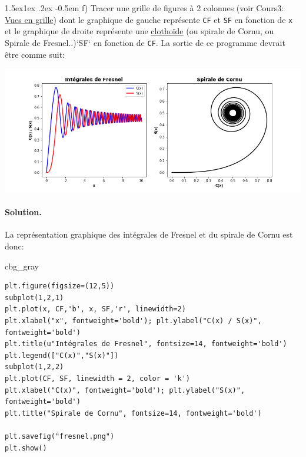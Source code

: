 \documentclass[%
oneside,                 %
final,                   %
10pt,french]{article}
\makeatletter
\newenvironment{_cod_tight}[1]{
   \def\FrameCommand{\colorbox{#1}}
   \FrameRule0.6pt\MakeFramed {\FrameRestore}\vskip3mm}
   {\vskip0mm\endMakeFramed}
\newenvironment{cod}[1]{
\bgroup\rmfamily
\fboxsep=0mm\relax
\begin{_cod_tight}{#1}
\list{}{\parsep=-2mm\parskip=0mm\topsep=0pt\leftmargin=2mm
\rightmargin=2\leftmargin\leftmargin=4pt\relax}
\item\relax}
{\endlist\end{_cod_tight}\egroup}
\newenvironment{doconceexercise}{}{}
\newcommand\subex{\@startsection{paragraph}{4}{\z@}%
                  {1.5ex\@plus1ex \@minus.2ex}%
                  {-0.5em}%
                  {\normalfont\normalsize\bfseries}}
\makeatother
\begin{document}
\begin{doconceexercise}

\subex{f)}
Tracer une grille de figures à 2 colonnes (voir Cours3: \href{{https://codetunisia.github.io/CoursSimNum/cours3/md/cours3.html#linstruction-subplot}}{Vues en grille}) dont le graphique de gauche représente \texttt{CF} et \texttt{SF} en fonction de \texttt{x} et le graphique de droite représente une \href{{https://fr.wikipedia.org/wiki/Clotho%C3%AFde}}{clothoïde} (ou spirale de Cornu, ou Spirale de Fresnel..)`SF` en fonction de \texttt{CF}.
La sortie de ce programme devrait être comme suit:


\vspace{6mm}

\centerline{\includegraphics[width=1.0\linewidth]{imgs/fresnel.png}}

\vspace{6mm}




\paragraph{Solution.}
La représentation graphique des intégrales de Fresnel et du spirale de Cornu est donc:
\begin{cod}{cbg_gray}\begin{verbatim}
plt.figure(figsize=(12,5))
subplot(1,2,1)
plt.plot(x, CF,'b', x, SF,'r', linewidth=2)
plt.xlabel("x", fontweight='bold'); plt.ylabel("C(x) / S(x)", fontweight='bold')
plt.title(u"Intégrales de Fresnel", fontsize=14, fontweight='bold')
plt.legend(["C(x)","S(x)"])
subplot(1,2,2)
plt.plot(CF, SF, linewidth = 2, color = 'k')
plt.xlabel("C(x)", fontweight='bold'); plt.ylabel("S(x)", fontweight='bold')
plt.title("Spirale de Cornu", fontsize=14, fontweight='bold')

plt.savefig("fresnel.png")
plt.show()
\end{verbatim}
\end{cod}
\noindent


\end{doconceexercise}



\end{document}
